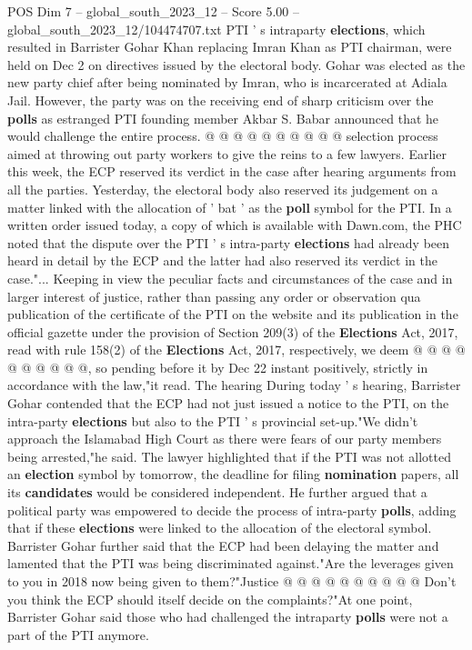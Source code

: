 \begin{textsample}{POS Dim 7 – global\_south\_2023\_12 – Score 5.00 – global\_south\_2023\_12/104474707.txt}
PTI ' s intraparty \textbf{elections}, which resulted in Barrister Gohar Khan replacing Imran Khan as PTI chairman, were held on Dec 2 on directives issued by the electoral body.
Gohar was elected as the new party chief after being nominated by Imran, who is incarcerated at Adiala Jail.
However, the party was on the receiving end of sharp criticism over the \textbf{polls} as estranged PTI founding member Akbar S.
Babar announced that he would challenge the entire process. @ @ @ @ @ @ @ @ @ @ selection process aimed at throwing out party workers to give the reins to a few lawyers.
Earlier this week, the ECP reserved its verdict in the case after hearing arguments from all the parties.
Yesterday, the electoral body also reserved its judgement on a matter linked with the allocation of ' bat ' as the \textbf{poll} symbol for the PTI.
In a written order issued today, a copy of which is available with Dawn.com, the PHC noted that the dispute over the PTI ' s intra-party \textbf{elections} had already been heard in detail by the ECP and the latter had also reserved its verdict in the case."...
Keeping in view the peculiar facts and circumstances of the case and in larger interest of justice, rather than passing any order or observation qua publication of the certificate of the PTI on the website and its publication in the official gazette under the provision of Section 209(3) of the \textbf{Elections} Act, 2017, read with rule 158(2) of the \textbf{Elections} Act, 2017, respectively, we deem @ @ @ @ @ @ @ @ @ @, so pending before it by Dec 22 instant positively, strictly in accordance with the law,"it read.
The hearing During today ' s hearing, Barrister Gohar contended that the ECP had not just issued a notice to the PTI, on the intra-party \textbf{elections} but also to the PTI ' s provincial set-up."We didn't approach the Islamabad High Court as there were fears of our party members being arrested,"he said.
The lawyer highlighted that if the PTI was not allotted an \textbf{election} symbol by tomorrow, the deadline for filing \textbf{nomination} papers, all its \textbf{candidates} would be considered independent.
He further argued that a political party was empowered to decide the process of intra-party \textbf{polls}, adding that if these \textbf{elections} were linked to the allocation of the electoral symbol.
Barrister Gohar further said that the ECP had been delaying the matter and lamented that the PTI was being discriminated against."Are the leverages given to you in 2018 now being given to them?"Justice @ @ @ @ @ @ @ @ @ @ Don't you think the ECP should itself decide on the complaints?"At one point, Barrister Gohar said those who had challenged the intraparty \textbf{polls} were not a part of the PTI anymore.

\end{textsample}
